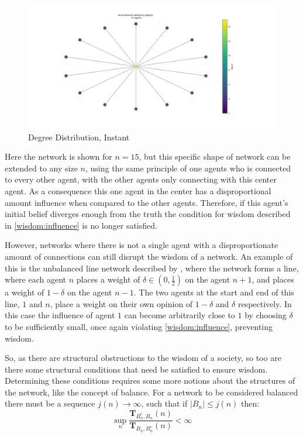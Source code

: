 \documentclass{article}
\newcommand{\T}{\textbf{T}}
\begin{document}
\begin{center}
    \begin{figure}[!htbp]
        \centering
        \includegraphics[width=\textwidth]{ThesisKI/Images/DegreeStarGraph.png}
        \caption{Degree Distribution, Instant}
        \label{network:star}
    \end{figure}
\end{center}
\newpage
Here the network is shown for $n=15$, but this specific shape of network can be extended to any size $n$, using the same principle of one agents who is connected to every other agent, with the other agents only connecting with this center agent. As a consequence this one agent in the center has a disproportional amount influence when compared to the other agents. Therefore, if this agent's initial belief diverges enough from the truth the condition for wisdom described in \ref{wisdom:influence} is no longer satisfied.

However, networks where there is not a single agent with a disproportionate amount of connections can still disrupt the wisdom of a network. An example of this is the unbalanced line network described by \cite{golub2010naive}, where the network forms a line, where each agent $n$ places a weight of $\delta \in (0, \frac{1}{2})$ on the agent $n+1$, and places a weight of $1-\delta$ on the agent $n-1$. The two agents at the start and end of this line, $1$ and $n$, place a weight on their own opinion of $1-\delta$ and $\delta$ respectively. In this case the influence of agent $1$ can become arbitrarily close to $1$ by choosing $\delta$ to be sufficiently small, once again violating \ref{wisdom:influence}, preventing wisdom.

So, as there are structural obstructions to the wisdom of a society, so too are there some structural conditions that need be satisfied to ensure wisdom. Determining these conditions requires some more notions about the structures of the network, like the concept of balance. For a network to be considered balanced there must be a sequence $j(n) \to \infty$, such that if $|B_n| \leq j(n)$ then:
\begin{equation}
    \sup_n \frac{\T_{B^c_n, B_n}(n)}{\T_{B_n, B^c_n}(n)} < \infty
\end{equation}
\end{document}
